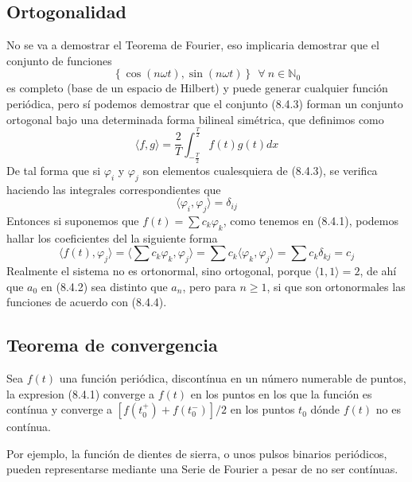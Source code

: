 \subsection{Ortogonalidad}
No se va a demostrar el Teorema de Fourier, eso implicaria demostrar que el conjunto de funciones
\begin{equation} \label{6.1.1}
    \left\{\cos(n\omega t),\sin(n\omega t)\right\} \ \ \forall \ n \in \mathbb{N}_0
\end{equation}
es completo (base de un espacio de Hilbert) y puede generar cualquier función periódica, pero sí podemos demostrar que el conjunto (8.4.3) forman un conjunto ortogonal bajo una determinada forma bilineal simétrica, que definimos como
\begin{equation} \label{6.1.1}
    \langle f,g \rangle = \frac{2}{T}\int_{-\frac{T}{2}}^{\frac{T}{2}} f(t) g(t) dx
\end{equation}
De tal forma que si $\varphi_i$ y $\varphi_j$ son elementos cualesquiera de (8.4.3), se verifica haciendo las integrales correspondientes que 
\begin{equation} \label{6.1.1}
    \langle \varphi_i, \varphi_j \rangle = \delta_{ij}
\end{equation}
Entonces si suponemos que $f(t) = \sum c_k \varphi_k$, como tenemos en (8.4.1), podemos hallar los coeficientes del la siguiente forma
\begin{equation} \label{6.1.1}
    \langle f(t), \varphi_j \rangle =\langle \sum c_k \varphi_k, \varphi_j \rangle =  \sum c_k \langle \varphi_k, \varphi_j \rangle= \sum c_k \delta_{kj} = c_j
\end{equation}
Realmente el sistema no es ortonormal, sino ortogonal, porque $\langle 1,1\rangle = 2$, de ahí que $a_0$ en (8.4.2) sea distinto que $a_n$, pero para $n\geq 1$, si que son ortonormales las funciones de acuerdo con (8.4.4).
\subsection{Teorema de convergencia}
Sea $f(t)$ una función periódica, discontínua en un número numerable de puntos, la expresion (8.4.1) converge a $f(t)$ en los puntos en los que la función es contínua y converge a $[f(t_0^+) + f(t_0^-)]/2$ en los puntos $t_0$ dónde $f(t)$ no es contínua.

Por ejemplo, la función de dientes de sierra, o unos pulsos binarios periódicos, pueden representarse mediante una Serie de Fourier a pesar de no ser contínuas.

